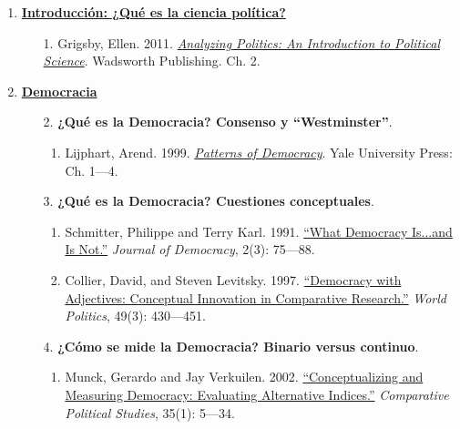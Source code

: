 \documentclass[letterpaper]{article}
\begin{document}
\begin{enumerate}  
\addtocounter{enumi}{-1}
		\item {\bf \underline{Introducci\'on: ¿Qu\'e es la ciencia pol\'itica?}}
			\begin{enumerate}
				\item[1.] Grigsby, Ellen. 2011. \href{https://github.com/hbahamonde/Ciencia_Politica_I/raw/master/Readings/Grigsby.pdf}{\emph{Analyzing Politics: An Introduction to Political Science}}. Wadsworth Publishing. Ch. 2.
			\end{enumerate}
		\item {\bf \underline{Democracia}}
			\begin{enumerate}
			
				\item[2.] {\bf ¿Qu\'e es la Democracia? Consenso y ``Westminster''}.
					\begin{enumerate}
						\item Lijphart, Arend. 1999. \href{https://github.com/hbahamonde/Ciencia_Politica_I/raw/master/Readings/Lijphart.pdf}{\emph{Patterns of Democracy}}. Yale University Press: Ch. 1---4.
					\end{enumerate}
			
				\item[3.] {\bf ¿Qu\'e es la Democracia? Cuestiones conceptuales}.
					\begin{enumerate}
					 \item Schmitter, Philippe and Terry Karl. 1991. \href{https://github.com/hbahamonde/Ciencia_Politica_I/raw/master/Readings/Schmitter_Karl.pdf}{``What Democracy Is...and Is Not.''} \emph{Journal of Democracy}, 2(3): 75---88.
					 
					 \item Collier, David, and Steven Levitsky. 1997. \href{https://github.com/hbahamonde/Ciencia_Politica_I/raw/master/Readings/Collier_Levitsky.pdf}{``Democracy with Adjectives: Conceptual Innovation in Comparative Research.''} \emph{World Politics}, 49(3): 430---451. 
					\end{enumerate}
			
				\item[4.] {\bf ¿C\'omo se mide la Democracia? Binario versus continuo}.
					\begin{enumerate}
						\item Munck, Gerardo and Jay Verkuilen. 2002. \href{https://github.com/hbahamonde/Ciencia_Politica_I/raw/master/Readings/Munck_Verkuilen.pdf}{``Conceptualizing and Measuring Democracy: Evaluating Alternative Indices.''} \emph{Comparative Political Studies}, 35(1): 5---34.%
						

\end{enumerate}
\end{enumerate}
\end{enumerate}
\end{document}
